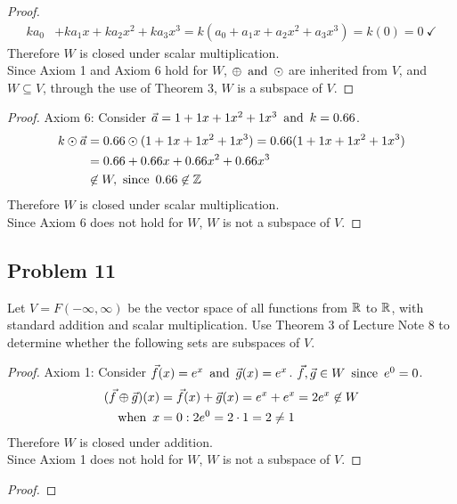\begin{enumerate}
\begin{proof}
\begin{align*}
      ka_0            & +ka_1x+ka_2x^2+ka_3x^3 = k(a_0+a_1x+a_2x^2+a_3x^3) = k(0) = 0~\checkmark
    \end{align*}
    Therefore $W$ is closed under scalar multiplication. \\
    Since Axiom 1 and Axiom 6 hold for $W$, $\oplus \operatorname{~\text{and}~} \odot$ are inherited from $V$, and $W \subseteq V$, through the use of Theorem 3, $W$ is a subspace of $V$.
  \end{proof}
  \begin{proof}
    Axiom 6: Consider $\vec{a} = 1+1x+1x^2+1x^3 \operatorname{~\text{and}~} k = 0.66$.
    \begin{align*}
      k \odot \vec{a} & = 0.66 \odot (1+1x+1x^2+1x^3) = 0.66(1+1x+1x^2+1x^3) \\
                      & = 0.66+0.66x+0.66x^2+0.66x^3                         \\
                      & \not \in W, \operatorname{~\text{since}~} 0.66 \not \in \mathbb{Z}             \\
    \end{align*}
    Therefore $W$ is  closed under scalar multiplication. \\
    Since Axiom 6 does not hold for $W$, $W$ is not a subspace of $V$.
  \end{proof}
\end{enumerate}

\subsection*{Problem 11}
Let $V = F(-\infty, \infty)$ be the vector space of all functions from $\mathbb{R}$ to $\mathbb{R}$, with standard addition and scalar multiplication. Use Theorem 3 of Lecture Note 8 to determine whether the following sets are subspaces of $V$.
\begin{enumerate}
  \begin{proof}
    Axiom 1: Consider $\vec{f}(x) = e^x \operatorname{~\text{and}~} \vec{g}(x) = e^x$. $\vec{f}, \vec{g} \in W \operatorname{~\text{since}~} e^0 = 0$.
    \begin{align*}
      (\vec{f} \oplus \vec{g})(x) & = \vec{f}(x) + \vec{g}(x) = e^x + e^x = 2e^x \not \in W \\
      \operatorname{~\text{when}~} x                    & = 0: 2e^0 = 2 \cdot 1 = 2 \neq 1
    \end{align*}
    Therefore $W$ is  closed under addition. \\
    Since Axiom 1 does not hold for $W$, $W$ is not a subspace of $V$.
  \end{proof}
  \begin{proof}

  \end{proof}
\end{enumerate}


